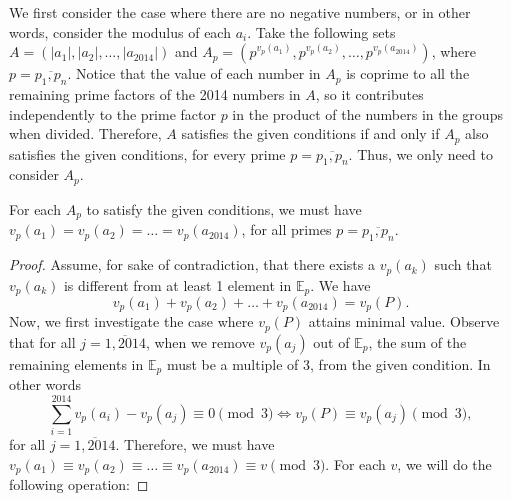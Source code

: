 \documentclass[11pt]{article}
\begin{document}
\begin{solution}
            We first consider the case where there are no negative numbers, or in other words, consider the modulus of each \(a_i\). Take the following sets \(A = \left(|a_1|, |a_2|, \dots, |a_{2014}|\right)\) and \(A_p = \left(p^{v_p(a_1)}, p^{v_p(a_2)}, \dots, p^{v_p(a_{2014})}\right)\), where \(p = \overline{p_1,p_n}\). Notice that the value of each number in \(A_p\) is coprime to all the remaining prime factors of the 2014 numbers in \(A\), so it contributes independently to the prime factor \(p\) in the product of the numbers in the groups when divided. Therefore, \(A\) satisfies the given conditions if and only if \(A_p\) also satisfies the given conditions, for every prime \(p = \overline{p_1,p_n}\). Thus, we only need to consider \(A_p\).
            
            \begin{claim}
                For each \(A_p\) to satisfy the given conditions, we must have \(v_p(a_1) = v_p(a_2) = \dots = v_p(a_{2014})\), for all primes \(p = \overline{p_1,p_n}\).
            \end{claim}

            \begin{proof}
                Assume, for sake of contradiction, that there exists a \(v_p(a_k)\) such that \(v_p(a_k)\) is different from at least 1 element in \(\mathbb{E}_p\). We have
                \[v_p(a_1) + v_p(a_2) + \dots + v_p(a_{2014}) = v_p(P).\]
                Now, we first investigate the case where \(v_p(P)\) attains minimal value. Observe that for all \(j = \overline{1,2014}\), when we remove \(v_p(a_j)\) out of \(\mathbb{E}_p\), the sum of the remaining elements in \(\mathbb{E}_p\) must be a multiple of 3, from the given condition. In other words
                \[\sum_{i=1}^{2014} v_p(a_i) - v_p(a_j) \equiv 0 \pmod{3} \iff v_p(P) \equiv v_p(a_j) \pmod{3},\]
                for all \(j = \overline{1,2014}\). Therefore, we must have \(v_p(a_1) \equiv v_p(a_2) \equiv \dots \equiv v_p(a_{2014}) \equiv v \pmod{3}\). For each \(v\), we will do the following operation:


\end{proof}
\end{solution}
\end{document}
